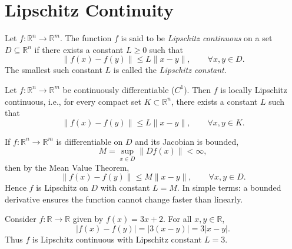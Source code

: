 \section{Lipschitz Continuity}

\begin{definition}
    Let $f: \mathbb{R}^n \to \mathbb{R}^m$.  
    The function $f$ is said to be \emph{Lipschitz continuous} on a set $D \subseteq \mathbb{R}^n$ if there exists a constant $L \geq 0$ such that
    \begin{equation}
        \| f(x) - f(y) \| \leq L \| x - y \|, \qquad \forall x,y \in D.
    \end{equation}
    The smallest such constant $L$ is called the \emph{Lipschitz constant}.
\end{definition}


\begin{theorem}
    Let $f: \mathbb{R}^n \to \mathbb{R}^m$ be continuously differentiable ($C^1$).  
    Then $f$ is locally Lipschitz continuous, i.e., for every compact set $K \subset \mathbb{R}^n$, there exists a constant $L$ such that
    \[
        \| f(x) - f(y) \| \leq L \| x - y \|, \qquad \forall x,y \in K.
    \]
\end{theorem}


\begin{remark}
    If $f:\mathbb{R}^n \to \mathbb{R}^m$ is differentiable on $D$ and its Jacobian is bounded,
    \[
        M = \sup_{x \in D} \|Df(x)\| < \infty,
    \]
    then by the Mean Value Theorem,
    \[
        \|f(x)-f(y)\| \leq M \|x-y\|, \qquad \forall x,y \in D.
    \]
    Hence $f$ is Lipschitz on $D$ with constant $L=M$.  
    In simple terms: a bounded derivative ensures the function cannot change faster than linearly.
\end{remark}


\begin{example}
    Consider $f:\mathbb{R}\to \mathbb{R}$ given by $f(x) = 3x + 2$.  
    For all $x,y \in \mathbb{R}$,
    \[
        |f(x)-f(y)| = |3(x-y)| = 3|x-y|.
    \]
    Thus $f$ is Lipschitz continuous with Lipschitz constant $L=3$.
\end{example}


